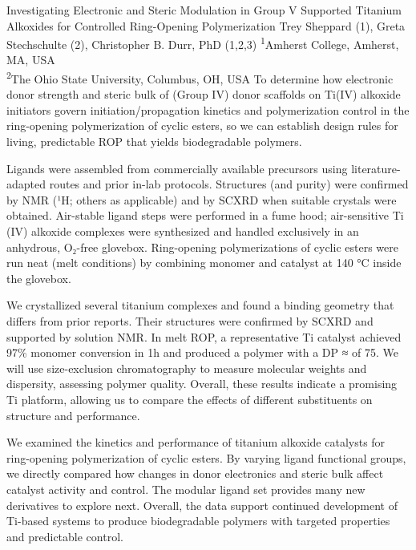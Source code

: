 \makeabstract
{
Investigating Electronic and Steric Modulation in Group V Supported Titanium Alkoxides for Controlled Ring-Opening Polymerization
}
{
Trey Sheppard (1), Greta Stechschulte (2), Christopher B. Durr, PhD (1,2,3)
}
{
\textsuperscript{1}Amherst College, Amherst, MA, USA\\
\textsuperscript{2}The Ohio State University, Columbus, OH, USA
}
{
To determine how electronic donor strength and steric bulk of (Group IV) donor scaffolds on Ti(IV) alkoxide initiators govern initiation/propagation kinetics and polymerization control in the ring-opening polymerization of cyclic esters, so we can establish design rules for living, predictable ROP that yields biodegradable polymers.
}
{
Ligands were assembled from commercially available precursors using literature-adapted routes and prior in-lab protocols. Structures (and purity) were confirmed by NMR (¹H; others as applicable) and by SCXRD when suitable crystals were obtained. Air-stable ligand steps were performed in a fume hood; air-sensitive Ti (IV) alkoxide complexes were synthesized and handled exclusively in an anhydrous, O₂-free glovebox. Ring-opening polymerizations of cyclic esters were run neat (melt conditions) by combining monomer and catalyst at 140 °C inside the glovebox.

}
{

We crystallized several titanium complexes and found a binding geometry that differs from prior reports. Their structures were confirmed by SCXRD and supported by solution NMR. In melt ROP, a representative Ti catalyst achieved 97\% monomer conversion in 1h and produced a polymer with a DP ≈ of 75. We will use size-exclusion chromatography to measure molecular weights and dispersity, assessing polymer quality. Overall, these results indicate a promising Ti platform, allowing us to compare the effects of different substituents on structure and performance.

}
{

We examined the kinetics and performance of titanium alkoxide catalysts for ring-opening polymerization of cyclic esters. By varying ligand functional groups, we directly compared how changes in donor electronics and steric bulk affect catalyst activity and control. The modular ligand set provides many new derivatives to explore next. Overall, the data support continued development of Ti-based systems to produce biodegradable polymers with targeted properties and predictable control.
}

\newpage
